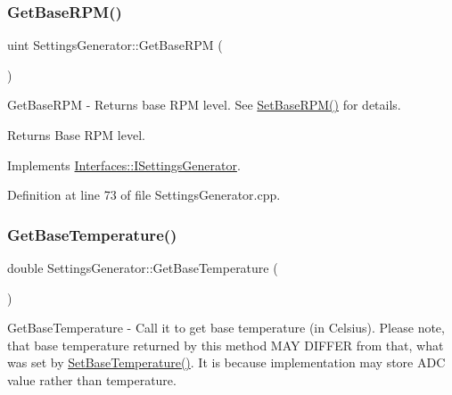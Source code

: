 \subsubsection{\texorpdfstring{Get\+Base\+R\+P\+M()}{GetBaseRPM()}}
{\footnotesize\ttfamily uint Settings\+Generator\+::\+Get\+Base\+R\+PM (\begin{DoxyParamCaption}{ }\end{DoxyParamCaption})\hspace{0.3cm}{\ttfamily [virtual]}}



Get\+Base\+R\+PM -\/ Returns base R\+PM level. See \hyperlink{class_settings_generator_a1c1960b9021f7081b4c42c4d7c0eda34}{Set\+Base\+R\+P\+M()} for details. 

\begin{DoxyReturn}{Returns}
Base R\+PM level. 
\end{DoxyReturn}


Implements \hyperlink{class_interfaces_1_1_i_settings_generator_ad088253da57b2ee0b94fe6fd1fb2dfdd}{Interfaces\+::\+I\+Settings\+Generator}.



Definition at line 73 of file Settings\+Generator.\+cpp.

\mbox{\label{class_settings_generator_a80b1ff8060a16d149989d98a88ab253e}} 
\subsubsection{\texorpdfstring{Get\+Base\+Temperature()}{GetBaseTemperature()}}
{\footnotesize\ttfamily double Settings\+Generator\+::\+Get\+Base\+Temperature (\begin{DoxyParamCaption}{ }\end{DoxyParamCaption})\hspace{0.3cm}{\ttfamily [virtual]}}



Get\+Base\+Temperature -\/ Call it to get base temperature (in Celsius). Please note, that base temperature returned by this method M\+AY D\+I\+F\+F\+ER from that, what was set by \hyperlink{class_settings_generator_aed9e7acb30bfd559b1ac70ceeddd8973}{Set\+Base\+Temperature()}. It is because implementation may store A\+DC value rather than temperature. 

